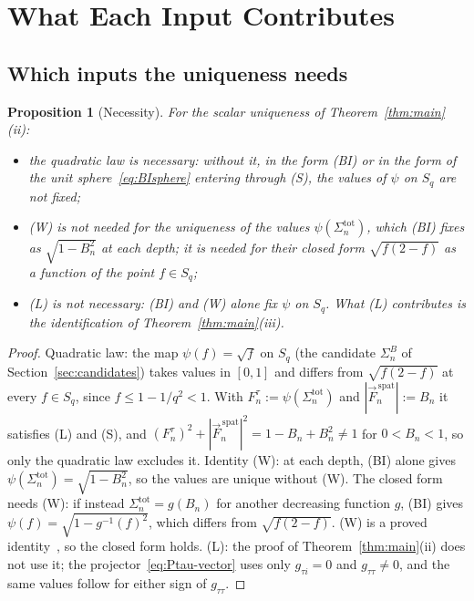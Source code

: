 \documentclass[11pt,a4paper]{article}
\newtheorem{proposition}[theorem]{Proposition}
\begin{document}
  \section{What Each Input Contributes}\label{sec:necessity}

    \subsection{Which inputs the uniqueness needs}

      \begin{proposition}[Necessity]\label{prop:necessity}
        For the scalar uniqueness of Theorem~\ref{thm:main}\textup{(ii)}:
        \begin{itemize}
          \item the quadratic law is necessary: without it, in the form \textup{(BI)} or in the form of the unit
          sphere~\eqref{eq:BIsphere} entering through \textup{(S)}, the values of $\psi$ on $S_q$ are not fixed;
          \item \textup{(W)} is not needed for the uniqueness of the values $\psi(\Sigma_n^{\mathrm{tot}})$, which
          \textup{(BI)} fixes as $\sqrt{1-B_n^2}$ at each depth; it is needed for their closed form
          $\sqrt{f(2-f)}$ as a function of the point $f \in S_q$;
          \item \textup{(L)} is not necessary: \textup{(BI)} and \textup{(W)} alone fix $\psi$ on $S_q$.
          What \textup{(L)} contributes is the identification of Theorem~\ref{thm:main}\textup{(iii)}.
        \end{itemize}
      \end{proposition}

      \begin{proof}
        Quadratic law: the map $\psi(f) = \sqrt{f}$ on $S_q$ (the candidate $\Sigma_n^B$ of
        Section~\ref{sec:candidates}) takes values in $[0,1]$ and differs from $\sqrt{f(2-f)}$ at every
        $f \in S_q$, since $f \le 1 - 1/q^2 < 1$.
        With $F_n^\tau := \psi(\Sigma_n^{\mathrm{tot}})$ and $|\vec{F}_n^{\,\mathrm{spat}}| := B_n$ it satisfies (L) and
        (S), and $(F_n^\tau)^2 + |\vec{F}_n^{\,\mathrm{spat}}|^2 = 1 - B_n + B_n^2 \neq 1$ for $0 < B_n < 1$, so only the
        quadratic law excludes it.
        Identity (W): at each depth, (BI) alone gives $\psi(\Sigma_n^{\mathrm{tot}}) = \sqrt{1-B_n^2}$, so the values are
        unique without (W).
        The closed form needs (W): if instead $\Sigma_n^{\mathrm{tot}} = g(B_n)$ for another decreasing function $g$,
        (BI) gives $\psi(f) = \sqrt{1 - g^{-1}(f)^2}$, which differs from $\sqrt{f(2-f)}$.
        (W) is a proved identity~\cite{Beau2026n}, so the closed form holds.
        (L): the proof of Theorem~\ref{thm:main}(ii) does not use it; the projector~\eqref{eq:Ptau-vector} uses only
        $g_{\tau i} = 0$ and $g_{\tau\tau} \neq 0$, and the same values follow for either sign of $g_{\tau\tau}$.
      \end{proof}
\end{document}
